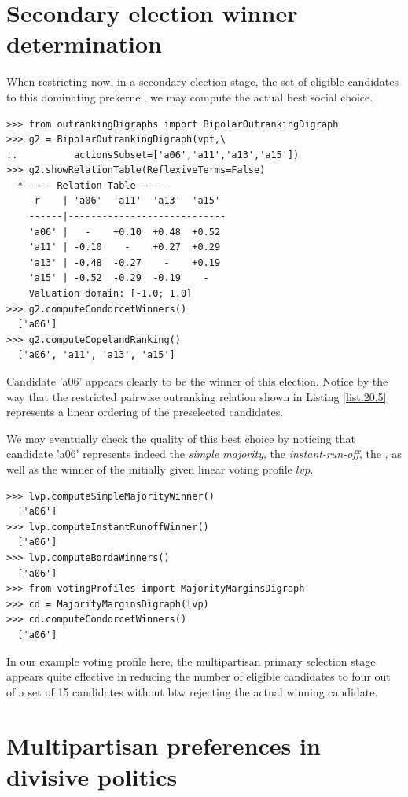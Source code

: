 \section{Secondary election winner determination}
\label{sec:20.3}

When restricting now, in a secondary election stage, the set of eligible candidates to this dominating prekernel, we may compute the actual best social choice.
\begin{lstlisting}[caption={Recommending the secondary election winner},label=list:20.5]
>>> from outrankingDigraphs import BipolarOutrankingDigraph
>>> g2 = BipolarOutrankingDigraph(vpt,\
..          actionsSubset=['a06','a11','a13','a15'])
>>> g2.showRelationTable(ReflexiveTerms=False)
  * ---- Relation Table -----
     r    | 'a06'  'a11'  'a13'  'a15'   
    ------|----------------------------
    'a06' |   -    +0.10  +0.48  +0.52  
    'a11' | -0.10    -    +0.27  +0.29  
    'a13' | -0.48  -0.27    -    +0.19  
    'a15' | -0.52  -0.29  -0.19    -   
    Valuation domain: [-1.0; 1.0]
>>> g2.computeCondorcetWinners()
  ['a06']
>>> g2.computeCopelandRanking()
  ['a06', 'a11', 'a13', 'a15']
\end{lstlisting}
Candidate 'a06' appears clearly to be the winner of this election. Notice by the way that the restricted pairwise outranking relation shown in Listing \ref{list:20.5} represents a linear ordering of the preselected candidates.

We may eventually check the quality of this best choice by noticing that candidate 'a06' represents indeed the \emph{simple majority}, the \emph{instant-run-off}, the \Borda, as well as the \Condorcet winner of the initially given linear voting profile $lvp$.
\begin{lstlisting}
>>> lvp.computeSimpleMajorityWinner()
  ['a06']
>>> lvp.computeInstantRunoffWinner()
  ['a06']
>>> lvp.computeBordaWinners()
  ['a06']
>>> from votingProfiles import MajorityMarginsDigraph
>>> cd = MajorityMarginsDigraph(lvp)
>>> cd.computeCondorcetWinners()
  ['a06']
\end{lstlisting}

In our example voting profile here, the multipartisan primary selection stage appears quite effective in reducing the number of eligible candidates to four out of a set of 15 candidates without btw rejecting the actual winning candidate.

\section{Multipartisan preferences in divisive politics}
\label{sec:20.4}

